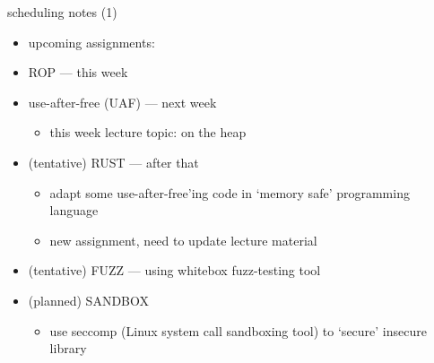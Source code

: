 \begin{frame}{scheduling notes (1)}
    \begin{itemize}
    \item upcoming assignments:
    \item ROP --- this week
    \item use-after-free (UAF) --- next week
        \begin{itemize}
        \item this week lecture topic: on the heap
        \end{itemize}
    \item (tentative) RUST --- after that
        \begin{itemize}
        \item adapt some use-after-free'ing code in `memory safe' programming language
        \item new assignment, need to update lecture material
        \end{itemize}
    \item (tentative) FUZZ --- using whitebox fuzz-testing tool
    \item (planned) SANDBOX 
        \begin{itemize}
        \item use seccomp (Linux system call sandboxing tool) to `secure' insecure library
        \end{itemize}
    \end{itemize}
\end{frame}

